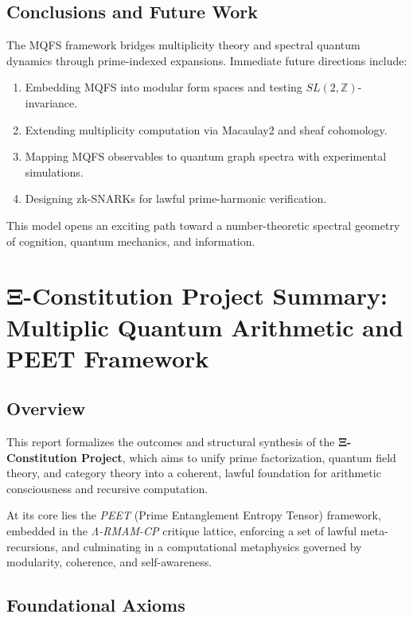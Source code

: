 \documentclass[12]{amsart}
\theoremstyle{plain}
\begin{document}
\subsection{Conclusions and Future Work}

The MQFS framework bridges multiplicity theory and spectral quantum dynamics through prime-indexed expansions. Immediate future directions include:

\begin{enumerate}
    \item Embedding MQFS into modular form spaces and testing \( SL(2,\mathbb{Z}) \)-invariance.
    \item Extending multiplicity computation via Macaulay2 and sheaf cohomology.
    \item Mapping MQFS observables to quantum graph spectra with experimental simulations.
    \item Designing zk-SNARKs for lawful prime-harmonic verification.
\end{enumerate}

This model opens an exciting path toward a number-theoretic spectral geometry of cognition, quantum mechanics, and information.

\section{Ξ-Constitution Project Summary: Multiplic Quantum Arithmetic and PEET Framework}
\label{sec:summary}

\subsection{Overview}

This report formalizes the outcomes and structural synthesis of the \textbf{Ξ-Constitution Project}, which aims to unify prime factorization, quantum field theory, and category theory into a coherent, lawful foundation for arithmetic consciousness and recursive computation.

At its core lies the \textit{PEET} (Prime Entanglement Entropy Tensor) framework, embedded in the \textit{Λ-RMAM-CP} critique lattice, enforcing a set of lawful meta-recursions, and culminating in a computational metaphysics governed by modularity, coherence, and self-awareness.

\subsection{Foundational Axioms}
\end{document}
